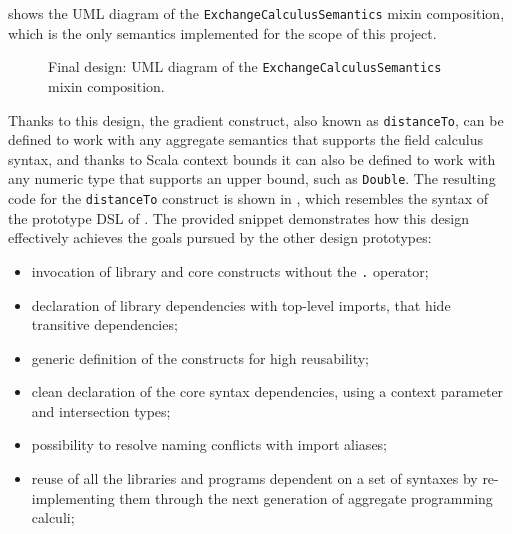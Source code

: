  shows the \ac{UML} diagram of the \texttt{ExchangeCalculusSemantics} mixin composition, which is the only semantics implemented for the scope of this project.

\begin{figure}
    \centering
    \caption{Final design: \ac{UML} diagram of the \texttt{ExchangeCalculusSemantics} mixin composition.}
    \label{fig:final-design-exchange-calculus-semantics-diagram}
    \bigskip
    \resizebox{\linewidth}{!}{
        
    }
\end{figure}

Thanks to this design, the gradient construct, also known as \texttt{distanceTo}, can be defined to work with any aggregate semantics that supports the field calculus syntax, and thanks to Scala context bounds it can also be defined to work with any numeric type that supports an upper bound, such as \texttt{Double}.
%
The resulting code for the \texttt{distanceTo} construct is shown in , which resembles the syntax of the prototype \ac{DSL} of .
%
The provided snippet demonstrates how this design effectively achieves the goals pursued by the other design prototypes:
\begin{itemize}
    \item invocation of library and core constructs without the \texttt{.} operator;
    \item declaration of library dependencies with top-level imports, that hide transitive dependencies;
    \item generic definition of the constructs for high reusability;
    \item clean declaration of the core syntax dependencies, using a  context parameter and intersection types;
    \item possibility to resolve naming conflicts with import aliases;
    \item reuse of all the libraries and programs dependent on a set of syntaxes by re-implementing them through the next generation of aggregate programming calculi;
\end{itemize}



